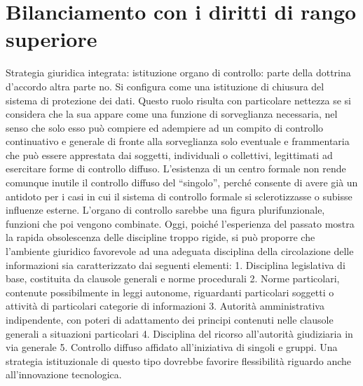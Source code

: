 \section{Bilanciamento con i diritti di rango superiore}
Strategia giuridica integrata:
istituzione organo di controllo: parte della dottrina d’accordo altra parte no. Si configura come una istituzione di chiusura del sistema di protezione dei dati. Questo ruolo risulta con particolare nettezza se si considera che la sua appare come una funzione di sorveglianza necessaria, nel senso che solo esso può compiere ed adempiere ad un compito di controllo continuativo e generale di fronte alla sorveglianza solo eventuale e frammentaria che può essere apprestata dai soggetti, individuali o collettivi, legittimati ad esercitare forme di controllo diffuso. L’esistenza di un centro formale non rende comunque inutile il controllo diffuso del “singolo”, perché consente di avere già un antidoto per i casi in cui il sistema di controllo formale si sclerotizzasse o subisse influenze esterne. L’organo di controllo sarebbe una figura plurifunzionale, funzioni che poi vengono combinate.
Oggi, poiché l’esperienza del passato mostra la rapida obsolescenza delle discipline troppo rigide, si può proporre che l’ambiente giuridico favorevole ad una adeguata disciplina della circolazione delle informazioni sia caratterizzato dai seguenti elementi:
1.	Disciplina legislativa di base, costituita da clausole generali e norme procedurali
2.	Norme particolari, contenute possibilmente in leggi autonome, riguardanti particolari soggetti o attività di particolari categorie di informazioni
3.	Autorità amministrativa indipendente, con poteri di adattamento dei principi contenuti nelle clausole generali a situazioni particolari
4.	Disciplina del ricorso all’autorità giudiziaria in via generale
5.	Controllo diffuso affidato all’iniziativa di singoli e gruppi.
Una strategia istituzionale di questo tipo dovrebbe favorire flessibilità riguardo anche all’innovazione tecnologica.

